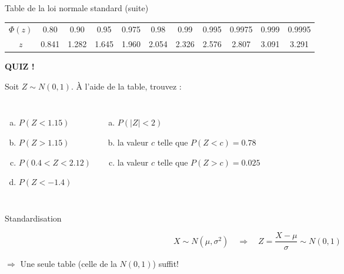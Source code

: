 \documentclass{BeamerTemplate}
\begin{document}
\begin{frame}[t]{Table de la loi normale standard (suite)}
  \bigskip
  \begin{tabular}{c|cccccccccc}
    \toprule
    $\Phi(z)$ & 0.80 & 0.90 & 0.95 & 0.975 & 0.98 & 0.99 & 0.995 & 0.9975 & 0.999 & 0.9995 \\
    $z$ & 0.841 & 1.282 & 1.645 & 1.960 & 2.054 & 2.326 & 2.576 & 2.807 & 3.091 & 3.291 \\
    \bottomrule
  \end{tabular}
\end{frame}

\begin{frame}[plain,t]
  \centerline{\LARGE\bfseries\alert{QUIZ !}}

  \medskip
  Soit $Z \sim N(0, 1)$. À l'aide de la table, trouvez :
  \begin{columns}[T]
      \begin{enumerate}[a)]\itemsep 5mm
        \item $P(Z < 1.15)$
        \item $P(Z > 1.15)$
        \item $P(0.4 < Z < 2.12)$
        \item $P(Z < -1.4)$
      \end{enumerate}
      \begin{enumerate}[a)]\itemsep 5mm
        \setcounter{enumi}{4}
        \item $P(|Z| < 2)$
        \item la valeur $c$ telle que $P(Z < c) = 0.78$
        \item la valeur $c$ telle que $P(Z > c) = 0.025$
      \end{enumerate}
  \end{columns}
\end{frame}

\begin{frame}[t]{Standardisation}
  \begin{thm}
    \[
      X \sim N(\mu, \sigma^2) \quad \Longrightarrow \quad
      Z = \frac{X - \mu}{\sigma} \sim N(0, 1)
    \]
  \end{thm}
  $\Rightarrow$ Une seule table (celle de la $N(0, 1)$) suffit!

  \medskip
\end{frame}
\end{document}
